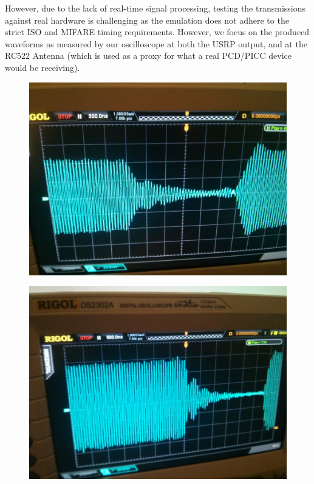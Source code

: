 \documentclass[fleqn,10pt]{SelfArx} %
\begin{document}
However, due to the lack of real-time signal processing, testing the transmissions against real hardware is challenging as the emulation does not adhere to the strict ISO and MIFARE timing requirements. However, we focus on the produced waveforms as measured by our oscilloscope at both the USRP output, and at the RC522 Antenna (which is used as a proxy for what a real PCD/PICC device would be receiving).

\begin{figure}[tp]
\centering
\begin{minipage}[b]{.47\linewidth}
  \centering
  \includegraphics[width=\textwidth]{img/emulated}
  \label{fig:emulated}
\end{minipage}
\begin{minipage}[b]{.47\linewidth}
  \centering
  \includegraphics[width=\textwidth]{img/real}
  \label{fig:real}
\end{minipage}
\end{figure}
\end{document}
